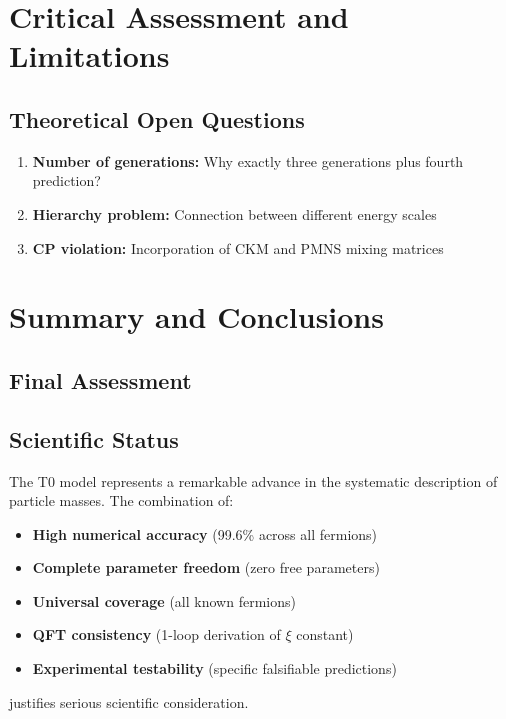 \documentclass[12pt,a4paper]{article}
\begin{document}
	\section{Critical Assessment and Limitations}
	\label{sec:critical_assessment}
	


	\subsection{Theoretical Open Questions}
	\label{subsec:open_questions}
	
	\begin{enumerate}

		\item \textbf{Number of generations:} Why exactly three generations plus fourth prediction?
		\item \textbf{Hierarchy problem:} Connection between different energy scales
		\item \textbf{CP violation:} Incorporation of CKM and PMNS mixing matrices
	\end{enumerate}
	
	\section{Summary and Conclusions}
	\label{sec:summary_conclusions}
	


	\subsection{Final Assessment}
	\label{subsec:final_assessment}
	
	\subsection{Scientific Status}
	\label{subsec:scientific_status}
	
	The T0 model represents a remarkable advance in the systematic description of particle masses. The combination of:
	
	\begin{itemize}
		\item \textbf{High numerical accuracy} (99.6\% across all fermions)
		\item \textbf{Complete parameter freedom} (zero free parameters)
		\item \textbf{Universal coverage} (all known fermions)
		\item \textbf{QFT consistency} (1-loop derivation of $\xi$ constant)
		\item \textbf{Experimental testability} (specific falsifiable predictions)
	\end{itemize}
	
	justifies serious scientific consideration.
	
\end{document}
